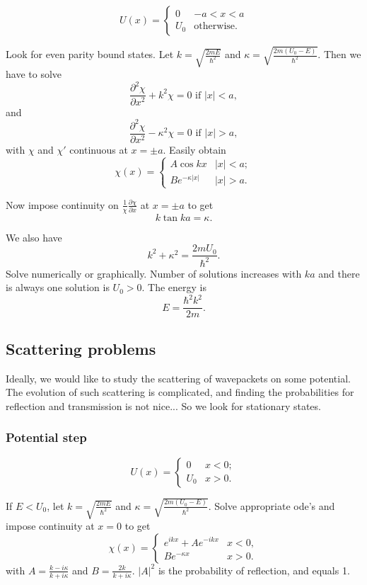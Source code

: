 \documentclass[a4paper]{article}
\newcommand{\pd}[2]{\frac{\partial #1}{\partial #2}}
\newcommand{\abs}[1]{\left| #1 \right|}
\begin{document}
\[
U(x) =
\begin{cases}
0       & -a < x < a \\
U_0     & \text{otherwise.}
\end{cases}
\]

Look for even parity bound states.  Let $k=\sqrt{\frac{2 m E}{\hbar^2}}$ and
$\kappa = \sqrt{\frac{2 m (U_0 - E)}{\hbar^2}}$.  Then we have to solve
\[
\pd{^2\chi}{x^2} + k^2 \chi = 0 \text{ if } \abs{x} < a,
\]
and
\[
\pd{^2\chi}{x^2} - \kappa^2 \chi = 0 \text{ if } \abs{x}>a,
\]
with $\chi$ and $\chi'$ continuous at $x=\pm a$.  Easily obtain
\[
\chi(x)=
\begin{cases}
A \cos k x      & \abs{x} < a; \\
B e^{-\kappa \abs{x}}   & \abs{x} > a.
\end{cases}
\]

Now impose continuity on $\frac{1}{\chi}\pd{\chi}{x}$ at $x=\pm a$ to get
\[
k \tan k a = \kappa.
\]

We also have
\[
k^2 + \kappa^2 = \frac{2 m U_0}{\hbar^2}.
\]
Solve numerically or graphically.  Number of solutions increases with $k a$
and there is always one solution is $U_0 > 0$.  The energy is
\[
E = \frac{\hbar^2 k^2}{2 m}.
\]

\subsection{Scattering problems}

Ideally, we would like to study the scattering of wavepackets on some
potential.  The evolution of such scattering is complicated, and finding the
probabilities for reflection and transmission is not nice...  So we look for
stationary states.

\subsubsection{Potential step}

\[
U(x) =
\begin{cases}
0 & x < 0; \\
U_0 &   x > 0.
\end{cases}
\]

If $E<U_0$, let $k=\sqrt{\frac{2 m E}{\hbar^2}}$ and 
$\kappa = \sqrt{\frac{2 m (U_0 - E)}{\hbar^2}}$.  Solve appropriate ode's
and impose continuity at $x=0$ to get
\[
\chi(x) =
\begin{cases}
e^{i k x} + A e^{-i k x}        & x < 0, \\
B e^{-\kappa x} & x > 0.
\end{cases}
\]
with $A = \frac{k-i\kappa}{k+i\kappa}$ and $B = \frac{2 k}{k + i \kappa}$.
$\abs{A}^2$ is the probability of reflection, and equals 1.
\end{document}
